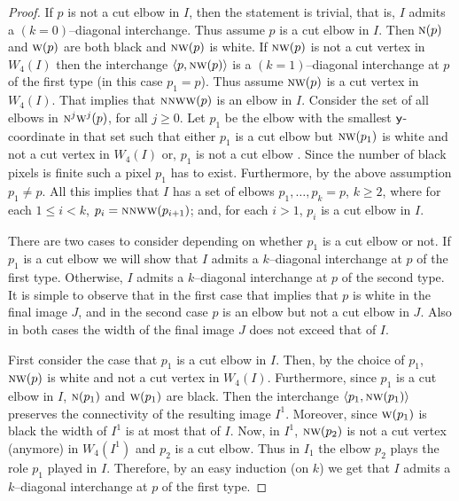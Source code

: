 \documentclass[lotsofwhite,charterfonts]{patmorin}
\newcommand{\N}{\textsc{n}}
\newcommand{\W}{\textsc{w}}
\newcommand{\NW}{\textsc{nw}}
\newcommand{\y}{\ensuremath{\protect\textup{\textsf{y}}}}
\newcommand{\ic}[2]{\langle #1,#2 \rangle}
\begin{document}
\begin{proof}
If $p$ is not a cut elbow in $I$, then the statement is trivial, that is, $I$ admits a $(k=0)$--diagonal interchange. Thus assume $p$ is a cut elbow in $I$. Then $\N(p)$ and $\W(p)$ are both black and $\NW(p)$ is white. If $\NW(p)$ is not a cut vertex in $W_4(I)$ then the interchange $\ic{p}{\NW(p)}$ is a $(k=1)$--diagonal interchange at $p$ of the first type (in this case $p_1=p$). Thus assume $\NW(p)$ is a cut vertex in $W_4(I)$. That implies that $\N\NW\W(p)$ is an elbow in $I$. Consider the set of all elbows in $\N^j\W^j(p)$, for all $j\geq 0$. Let $p_1$ be the elbow with the smallest \y-coordinate in that set such that either $p_1$ is a cut elbow but $\NW(p_1)$ is white and not a cut vertex in $W_4(I)$ or, $p_1$ is not a cut elbow . Since the number of black pixels is finite such a pixel $p_1$ has to exist. Furthermore, by the above assumption $p_1\not=p$. All this implies that $I$ has a set of elbows $p_1,\dots, p_k=p$, $k\geq 2$, where for each $1\leq i< k$, $p_i=\N\N\W\W(p_{i+1})$; and, for each $i>1$, $p_i$ is a cut elbow in $I$. 

There are two cases to consider depending on whether $p_1$ is a cut elbow or not. If $p_1$ is a cut elbow we will show that $I$ admits a $k$--diagonal interchange at $p$ of the first type. Otherwise, $I$ admits a $k$--diagonal interchange at $p$ of the second type. It is simple to observe that in the first case that implies that $p$ is white in the final image $J$, and in the second case $p$ is an elbow but not a cut elbow in $J$. Also in both cases the width of the final image $J$ does not exceed that of $I$.

First consider the case that $p_1$ is a cut elbow in $I$. Then, by the
choice of $p_1$, $\NW(p)$ is white and not a cut vertex in $W_4(I)$.
Furthermore, since $p_1$ is a cut elbow in $I$, $\N(p_1)$ and
$\W(p_1)$ are black. Then the interchange $\ic{p_1}{\NW(p_1)}$
preserves the connectivity of the resulting image $I^1$. Moreover,
since $\W(p_1)$ is black the width of $I^1$ is at most that of $I$.
Now, in $I^1$, $\NW(p_2)$ is not a cut vertex (anymore) in $W_4(I^1)$
and $p_2$ is a cut elbow. Thus in $I_1$ the elbow $p_2$ plays the role
$p_1$ played in $I$. Therefore, by an easy induction (on $k$) we get
that $I$ admits a $k$--diagonal interchange at $p$ of the first type. 


\end{proof}
\end{document}
